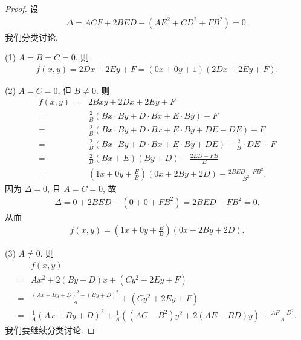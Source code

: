 \documentclass[%
    UTF8,%
    fontset=none,%
    punct=kaiming,%
    zihao=-4,%
    a4paper,%
    oneside,%
]{ctexbook}
\begin{document}
\begin{proof}
    设
    \begin{align*}
        \Delta = ACF + 2BED - (AE^2 + CD^2 + FB^2) = 0.
    \end{align*}
    我们分类讨论.

    (1)
    \(A = B = C = 0\).
    则
    \begin{align*}
        f(x, y)
        = 2Dx + 2Ey + F
        = (0x + 0y + 1)(2Dx + 2Ey + F).
    \end{align*}

    (2)
    \(A = C = 0\), 但 \(B \neq 0\).
    则
    \begin{align*}
        f(x, y)
        = {} & 2Bxy + 2Dx + 2Ey + F                                                               \\
        = {} & \frac{2}{B}(Bx \cdot By + D \cdot Bx + E \cdot By) + F                             \\
        = {} & \frac{2}{B}(Bx \cdot By + D \cdot Bx + E \cdot By + DE - DE) + F                   \\
        = {} & \frac{2}{B}(Bx \cdot By + D \cdot Bx + E \cdot By + DE) - \frac{2}{B} \cdot DE + F \\
        = {} & \frac{2}{B}(Bx + E)(By + D) - \frac{2ED - FB}{B}                                   \\
        = {} & \left(1x + 0y + \frac{E}{B}\right)(0x + 2By + 2D) - \frac{2BED - FB^2}{B^2}.
    \end{align*}
    因为 \(\Delta = 0\), 且 \(A = C = 0\), 故
    \begin{align*}
        \Delta = 0 + 2BED - (0 + 0 + FB^2) = 2BED - FB^2 = 0.
    \end{align*}
    从而
    \begin{align*}
        f(x, y) = \left(1x + 0y + \frac{E}{B}\right)(0x + 2By + 2D).
    \end{align*}

    (3)
    \(A \neq 0\).
    则
    \begin{align*}
             & f(x, y)                                                                                      \\
        = {} & Ax^2 + 2(By + D)x + (Cy^2 + 2Ey + F)                                                         \\
        = {} & \frac{(Ax + By + D)^2 - (By + D)^2}{A}
        + (Cy^2 + 2Ey + F)                                                                                  \\
        = {} & \frac{1}{A} (Ax + By + D)^2 + \frac{1}{A}((AC - B^2)y^2 + 2(AE - BD)y) + \frac{AF - D^2}{A}.
    \end{align*}
    我们要继续分类讨论.


\end{proof}
\end{document}
